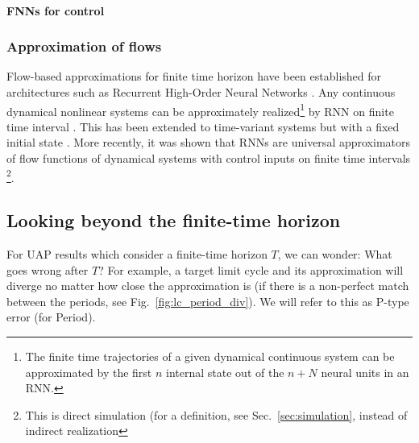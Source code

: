 \documentclass{article}
\theoremstyle{definition}
\theoremstyle{remark}
\newcommand{\reals}{\mathbb{R}}
\newcounter{ct}
\begin{document}
\paragraph{FNNs for control}
\citep{psaltis1988multilayered} \citep{li1989control,chen1992adaptive}




\subsubsection{Approximation of flows}%
Flow-based approximations for finite time horizon have been established for architectures such as Recurrent High-Order Neural Networks \citep{kosmatopoulos1995structural}.
Any continuous dynamical nonlinear systems can be approximately realized\footnote{The finite time trajectories of a given dynamical continuous system can be approximated by the first $n$ internal state out of the $n + N$ neural units in an RNN.} by RNN on finite time interval \citep{chow2000modeling}.
%
This has been extended to time-variant systems but with a fixed initial state \citep{li2005approximation}. %
%
More recently, it was shown that RNNs are universal approximators of flow functions of dynamical systems  with control inputs on finite time intervals  \citep{aguiar2023universal}\footnote{This is direct simulation (for a definition, see Sec.~\ref{sec:simulation}, instead of indirect realization}. %


\subsection{Looking beyond the finite-time horizon}\label{sec:beyondfinitetime}

For UAP results which consider a finite-time horizon $T$, we can wonder: What goes wrong after $T$?
%
For example, a target limit cycle and its approximation will diverge no matter how close the approximation is (if there is a non-perfect match between the periods, see Fig.~\ref{fig:lc_period_div}).
We will refer to this as P-type error (for Period).
\end{document}
